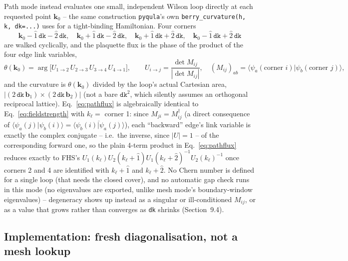 \documentclass[11pt]{article}
\begin{document}
Path mode instead evaluates one small, independent Wilson loop directly at each
requested point $\mathbf k_0$ -- the same construction \texttt{pyqula}'s own
\texttt{berry\_curvature(h, k, dk=...)} uses for a tight-binding Hamiltonian. Four
corners
\begin{equation}
  \mathbf k_0 - \hat 1\,\texttt{dk} - \hat 2\,\texttt{dk}, \quad
  \mathbf k_0 + \hat 1\,\texttt{dk} - \hat 2\,\texttt{dk}, \quad
  \mathbf k_0 + \hat 1\,\texttt{dk} + \hat 2\,\texttt{dk}, \quad
  \mathbf k_0 - \hat 1\,\texttt{dk} + \hat 2\,\texttt{dk}
  \label{eq:corners}
\end{equation}
are walked cyclically, and the plaquette flux is the phase of the product of the four
edge link variables,
\begin{equation}
  \theta(\mathbf k_0) = \arg\bigl[U_{1\to2}\,U_{2\to3}\,U_{3\to4}\,U_{4\to1}\bigr],
  \qquad U_{i\to j} = \frac{\det M_{ij}}{|\det M_{ij}|}, \quad
  (M_{ij})_{ab} = \langle\psi_a(\text{corner } i)|\psi_b(\text{corner } j)\rangle,
  \label{eq:pathflux}
\end{equation}
and the curvature is $\theta(\mathbf k_0)$ divided by the loop's actual Cartesian area,
$|(2\,\texttt{dk}\,\mathbf b_1)\times(2\,\texttt{dk}\,\mathbf b_2)|$ (not a bare
$\texttt{dk}^2$, which silently assumes an orthogonal reciprocal lattice).
Eq.~\eqref{eq:pathflux} is algebraically identical to Eq.~\eqref{eq:fieldstrength} with
$k_\ell = $ corner 1: since $M_{ji} = M_{ij}^\dagger$ (a direct consequence of
$\langle\psi_a(j)|\psi_b(i)\rangle = \overline{\langle\psi_b(i)|\psi_a(j)\rangle}$), each
``backward'' edge's link variable is exactly the complex conjugate -- i.e.\ the
inverse, since $|U|=1$ -- of the corresponding forward one, so the plain 4-term product
in Eq.~\eqref{eq:pathflux} reduces exactly to FHS's
$U_1(k_\ell)U_2(k_\ell+\hat1)U_1(k_\ell+\hat2)^{-1}U_2(k_\ell)^{-1}$ once corners 2 and 4
are identified with $k_\ell+\hat1$ and $k_\ell+\hat2$. No Chern number is defined for a
single loop (that needs the closed cover), and no automatic gap check runs in this mode
(no eigenvalues are exported, unlike mesh mode's boundary-window eigenvalues) --
degeneracy shows up instead as a singular or ill-conditioned $M_{ij}$, or as a value that
grows rather than converges as \texttt{dk} shrinks (Section~9.4).

\subsection{Implementation: fresh diagonalisation, not a mesh lookup}
\end{document}
